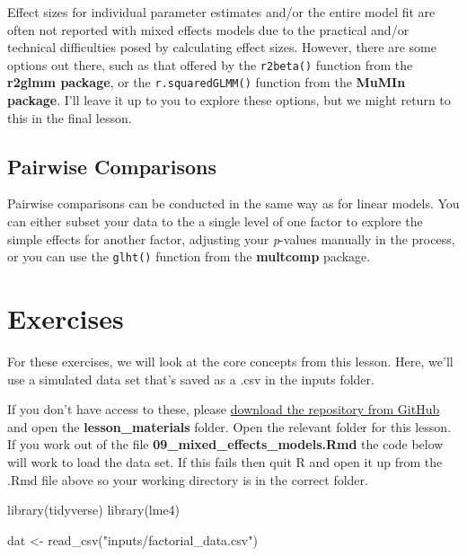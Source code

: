 \documentclass[
]{book}
\newenvironment{Shaded}{\begin{snugshade}}{\end{snugshade}}
\newcommand{\FunctionTok}[1]{\textcolor[rgb]{0.00,0.00,0.00}{#1}}
\newcommand{\NormalTok}[1]{#1}
\newcommand{\OtherTok}[1]{\textcolor[rgb]{0.56,0.35,0.01}{#1}}
\newcommand{\StringTok}[1]{\textcolor[rgb]{0.31,0.60,0.02}{#1}}
\begin{document}
Effect sizes for individual parameter estimates and/or the entire model fit are often not reported with mixed effects models due to the practical and/or technical difficulties posed by calculating effect sizes. However, there are some options out there, such as that offered by the \texttt{r2beta()} function from the \textbf{r2glmm package}, or the \texttt{r.squaredGLMM()} function from the \textbf{MuMIn package}. I'll leave it up to you to explore these options, but we might return to this in the final lesson.

\hypertarget{pairwise-comparisons}{%
\subsection{Pairwise Comparisons}\label{pairwise-comparisons}}

Pairwise comparisons can be conducted in the same way as for linear models. You can either subset your data to the a single level of one factor to explore the simple effects for another factor, adjusting your \emph{p}-values manually in the process, or you can use the \texttt{glht()} function from the \textbf{multcomp} package.

\hypertarget{exercises-8}{%
\section{Exercises}\label{exercises-8}}

For these exercises, we will look at the core concepts from this lesson. Here, we'll use a simulated data set that's saved as a .csv in the inputs folder.

If you don't have access to these, please \href{https://github.com/gpwilliams/r4psych}{download the repository from GitHub} and open the \textbf{lesson\_materials} folder. Open the relevant folder for this lesson. If you work out of the file \textbf{09\_mixed\_effects\_models.Rmd} the code below will work to load the data set. If this fails then quit R and open it up from the .Rmd file above so your working directory is in the correct folder.

\begin{Shaded}
\begin{Highlighting}[]
\FunctionTok{library}\NormalTok{(tidyverse)}
\FunctionTok{library}\NormalTok{(lme4)}
\end{Highlighting}
\end{Shaded}

\begin{Shaded}
\begin{Highlighting}[]
\NormalTok{dat }\OtherTok{\textless{}{-}} \FunctionTok{read\_csv}\NormalTok{(}\StringTok{"inputs/factorial\_data.csv"}\NormalTok{)}
\end{Highlighting}
\end{Shaded}
\end{document}
